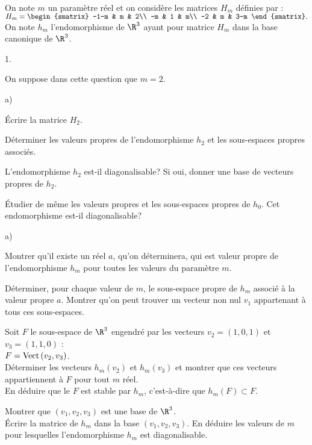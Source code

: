 \documentclass[11pt]{article}%
\begin{document}
\begin{exercice}~\\
On note $m$ un paramètre réel et on considère les matrices $H_m$ 
définies
par : $H_m=
\begin{smatrix}
-1-m & m & 2\\
-m & 1 & m\\
-2 & m & 3-m
\end{smatrix}.$\\
On note $h_{m}$ l'endomorphisme de $\R^3$ ayant pour matrice 
$H_m$ dans la base canonique de $\R^3$.

\begin{noliste}{1.}
\item 
On suppose dans cette question que $m=2$.

\begin{noliste}{a)}
\item
Écrire la matrice $H_2$.
\item 
Déterminer les valeurs propres de l'endomorphisme $h_{2}$ et les 
sous-espaces propres associés.

\item 
L'endomorphisme $h_2$ est-il diagonalisable? Si oui, donner une base de 
vecteurs propres de $h_2$.
\end{noliste}

\item 
Étudier de même les valeurs propres et les sous-espaces propres de 
$h_{0}$. Cet endomorphisme est-il diagonalisable?

\item 
\begin{noliste}{a)}
\item 
Montrer qu'il existe un réel $a$, qu'on déterminera, qui est valeur
propre de l'endomorphisme $h_m$ pour toutes les valeurs du paramètre 
$m$.

\item 
Déterminer, pour chaque valeur de $m$, le sous-espace propre de $h_m$ 
associé à
la valeur propre $a$. Montrer qu'on peut trouver un vecteur non nul 
$v_{1}$
appartenant à tous ces sous-espaces.
\end{noliste}

\item 
Soit $F$ le sous-espace de $\R^3$ engendré par les vecteurs 
$v_2=(1,0,1)$ et $v_3=(1,1,0)$ :\\ 
$F={\rm{Vect}}\left(v_2,v_3\right)$.\\
Déterminer les vecteurs $h_m(v_2)$ et $h_m(v_3)$ et montrer que 
ces vecteurs appartiennent à $F$ pour tout $m$ réel.\\
En déduire que le $F$ est stable par $h_m$, c'est-à-dire que 
$h_m(F)\subset F$.

\item 
Montrer que $(v_1,v_2,v_3)$ est une base de $\R^3$.\\
\'Ecrire la matrice de $h_m$ dans la base $(v_1,v_2,v_3)$. En déduire 
les valeurs de $m$ pour lesquelles l'endomorphisme $h_m$ est 
diagonalisable.
\end{noliste}
\end{exercice}
\end{document}
